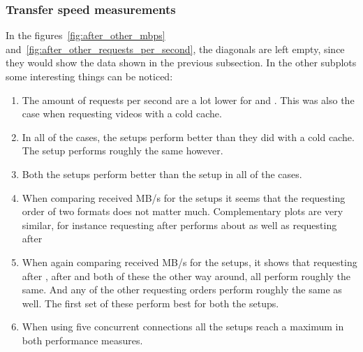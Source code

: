 \documentclass[twoside,openright]{uva-bachelor-thesis}
\begin{document}
\subsubsection{Transfer speed measurements}
In the figures~\ref{fig:after_other_mbps}
and~\ref{fig:after_other_requests_per_second}, the diagonals are left empty,
since they would show the data shown in the previous subsection. In the other
subplots some interesting things can be noticed:
\begin{enumerate}
    \item
        The amount of requests per second are a lot lower for \hds and \hls.
        This was also the case when requesting videos with a cold cache.

    \item
        In all of the cases, the \lt setups perform better than they did with a
        cold cache. The \cdn setup performs roughly the same however.

    \item
        Both the \lt setups perform better than the \cdn setup in all of the
        cases.

    \item
        When comparing received MB/s for the \lt setups it seems that the
        requesting order of two formats does not matter much. Complementary
        plots are very similar, for instance requesting \dash after \iss
        performs about as well as requesting \iss after \dash

    \item
        When again comparing received MB/s for the \lt setups, it shows that
        requesting \hls after \hds, \dash after \iss and both of these the other
        way around, all perform roughly the same. And any of the other
        requesting orders perform roughly the same as well. The first set of
        these perform best for both the \lt setups.

    \item
        When using five concurrent connections all the setups reach a maximum in
        both performance measures.

\end{enumerate}


\FloatBarrier
\end{document}
